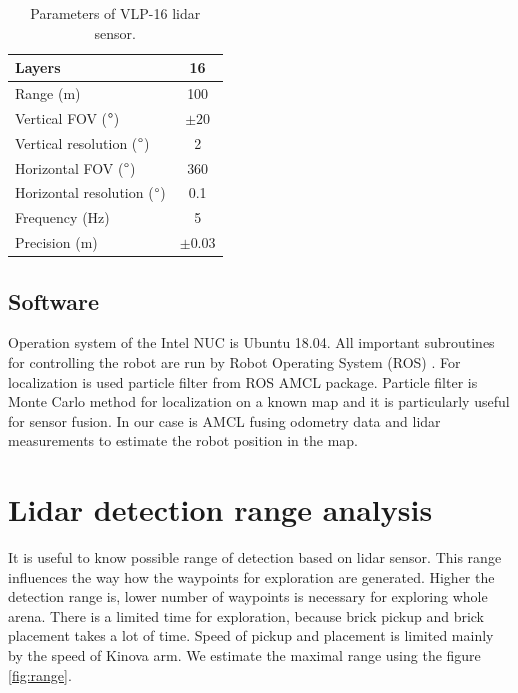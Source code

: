 \begin{table}[H]
\centering
\begin{tabular}{|l|c|}
\hline
Layers                            & 16   \\ \hline
Range (m)                         & 100  \\ \hline
Vertical FOV ($\degree$)          & $\pm20$   \\ \hline
Vertical resolution ($\degree$)   & 2    \\ \hline
Horizontal FOV ($\degree$)        & 360  \\ \hline
Horizontal resolution ($\degree$) & 0.1  \\ \hline
Frequency (Hz)                    & 5    \\ \hline
Precision (m)                     & $\pm0.03$ \\ \hline
\end{tabular}
\caption{Parameters of VLP-16 lidar sensor.}
\label{tab:lidar}
\end{table}

\subsection{Software}
Operation system of the Intel NUC is Ubuntu 18.04. All important subroutines for controlling the robot are run by Robot Operating System (ROS) \cite{ros}. For localization is used particle filter from ROS AMCL package. Particle filter is Monte Carlo method for localization on a known map and it is particularly useful for sensor fusion. In our case is AMCL fusing odometry data and lidar measurements to estimate the robot position in the map.

\section{Lidar detection range analysis}
It is useful to know possible range of detection based on lidar sensor. This range influences the way how the waypoints for exploration are generated. Higher the detection range is, lower number of waypoints is necessary for exploring whole arena. There is a limited time for exploration, because brick pickup and brick placement takes a lot of time. Speed of pickup and placement is limited mainly by the speed of Kinova arm. We estimate the maximal range using the figure \ref{fig:range}.

